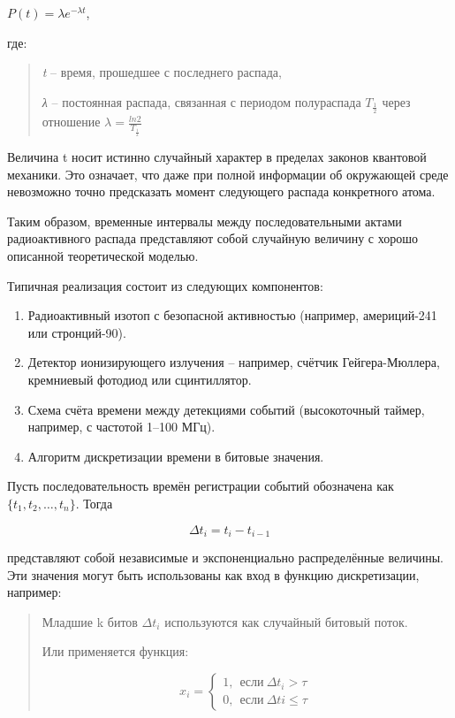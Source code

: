 \(P(t) = \lambda e^{- \lambda t}\),

где:

\begin{quote}
\emph{t} -- время, прошедшее с последнего распада,

\emph{λ} -- постоянная распада, связанная с периодом полураспада
\(T_{\frac{1}{2}}\)\hspace{0pt} через отношение
\(\lambda = \frac{ln2}{T_{\frac{1}{2}}}\)
\end{quote}

Величина t носит истинно случайный характер в пределах законов квантовой
механики. Это означает, что даже при полной информации об окружающей
среде невозможно точно предсказать момент следующего распада конкретного
атома.

Таким образом, временные интервалы между последовательными актами
радиоактивного распада представляют собой случайную величину с хорошо
описанной теоретической моделью.

Типичная реализация состоит из следующих компонентов:

\begin{enumerate}
\def\labelenumi{\arabic{enumi}.}
\item
  Радиоактивный изотоп с безопасной активностью (например, америций-241
  или стронций-90).
\item
  Детектор ионизирующего излучения -- например, счётчик Гейгера-Мюллера,
  кремниевый фотодиод или сцинтиллятор.
\item
  Схема счёта времени между детекциями событий (высокоточный таймер,
  например, с частотой 1--100 МГц).
\item
  Алгоритм дискретизации времени в битовые значения.
\end{enumerate}

Пусть последовательность времён регистрации событий обозначена как
\(\{ t_{1},t_{2},\ldots,t_{n}\}\). Тогда

\[\Delta t_{i} = t_{i} - t_{i - 1}\]

представляют собой независимые и экспоненциально распределённые
величины. Эти значения могут быть использованы как вход в функцию
дискретизации, например:

\begin{quote}
Младшие k битов \(\Delta t_{i}\)\hspace{0pt} используются как случайный
битовый поток.

Или применяется функция:

\[x_{i} = \left\{ \begin{array}{r}
1,\ \ если\ \Delta t_{i} > \tau \\
0,\ \ если\ \Delta ti \leq \tau
\end{array} \right.\ \]
\end{quote}

